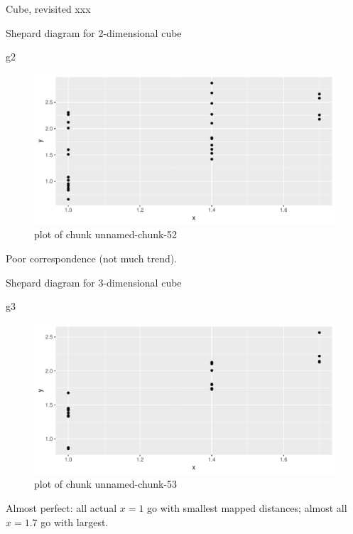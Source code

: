 \documentclass[ignorenonframetext,]{beamer}
\newenvironment{Shaded}{\begin{snugshade}}{\end{snugshade}}
\newcommand{\NormalTok}[1]{#1}
\begin{document}
\begin{frame}[fragile]{Cube, revisited xxx}
\normalsize

\end{frame}

\begin{frame}[fragile]{Shepard diagram for 2-dimensional cube}
\protect\hypertarget{shepard-diagram-for-2-dimensional-cube}{}

\begin{Shaded}
\begin{Highlighting}[]
\NormalTok{g2}
\end{Highlighting}
\end{Shaded}

\begin{figure}
\centering
\includegraphics{figure/unnamed-chunk-52-1.pdf}
\caption{plot of chunk unnamed-chunk-52}
\end{figure}

Poor correspondence (not much trend).

\end{frame}

\begin{frame}[fragile]{Shepard diagram for 3-dimensional cube}
\protect\hypertarget{shepard-diagram-for-3-dimensional-cube}{}

\begin{Shaded}
\begin{Highlighting}[]
\NormalTok{g3}
\end{Highlighting}
\end{Shaded}

\begin{figure}
\centering
\includegraphics{figure/unnamed-chunk-53-1.pdf}
\caption{plot of chunk unnamed-chunk-53}
\end{figure}

Almost perfect: all actual \(x=1\) go with smallest mapped distances;
almost all \(x=1.7\) go with largest.

\end{frame}
\end{document}
